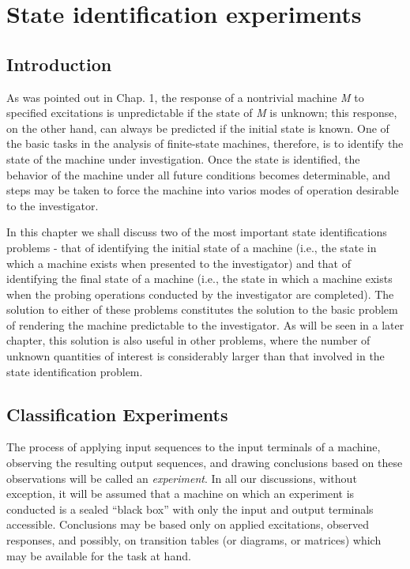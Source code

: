 \chapter{State identification experiments}

\section{Introduction}

As was pointed out in Chap. 1, the response of a nontrivial machine \emph{M} to specified excitations is unpredictable if the state of \emph{M} is unknown; this response, on the other hand, can always be predicted if the initial state is known. One of the basic tasks in the analysis of finite-state machines, therefore, is to identify the state of the machine under investigation. Once the state is identified, the behavior of the machine under all future conditions becomes determinable, and steps may be taken to force the machine into varios modes of operation desirable to the investigator.

    In this chapter we shall discuss two of the most important state identifications problems - that of identifying the initial state of a machine (i.e., the state in which a machine exists when presented to the investigator) and that of identifying the final state of a machine (i.e., the state in which a machine exists when the probing operations conducted by the investigator are completed). The solution to either of these problems constitutes the solution to the basic problem of rendering the machine predictable to the investigator. As will be seen in a later chapter, this solution is also useful in other problems, where the number of unknown quantities of interest is considerably larger than that involved in the state identification problem.

\section{Classification Experiments}

    The process of applying input sequences to the input terminals of a machine, observing the resulting output sequences, and drawing conclusions based on these observations will be called an \emph{experiment}. In all our discussions, without exception, it will be assumed that a machine on which an experiment is conducted is a sealed ``black box'' with only the input and output terminals accessible. Conclusions may be based only on applied excitations, observed responses, and possibly, on transition tables (or diagrams, or matrices) which may be available for the task at hand.

